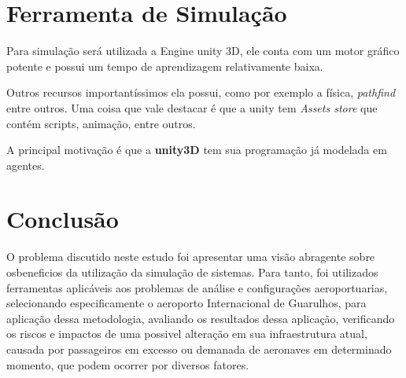 \documentclass[12pt]{article}
\begin{document}
\section{Ferramenta de Simulação}

Para simulação será utilizada a Engine unity 3D, ele conta com um motor 
gráfico potente e possui um tempo de aprendizagem relativamente baixa.

Outros recursos importantíssimos ela possui, como por exemplo a física, 
\textit{pathfind} entre outros. Uma coisa que vale destacar é que a unity
tem \textit{Assets store} que contém scripts, animação, entre outros.

A principal motivação é que a \textbf{unity3D} tem sua programação já
modelada em agentes.



\section{Conclusão}

O problema discutido neste estudo foi apresentar uma visão abragente 
sobre osbeneficios da utilização da simulação de sistemas. Para tanto, foi 
utilizados ferramentas aplicáveis aos problemas de análise e configurações 
aeroportuarias, selecionando especificamente o aeroporto Internacional de
Guarulhos, para aplicação dessa metodologia, avaliando os resultados dessa
aplicação, verificando os riscos e impactos de uma possivel alteração em
sua infraestrutura atual, causada por passageiros em excesso ou demanada de 
aeronaves em determinado momento, que podem ocorrer por diversos fatores.




\end{document}
